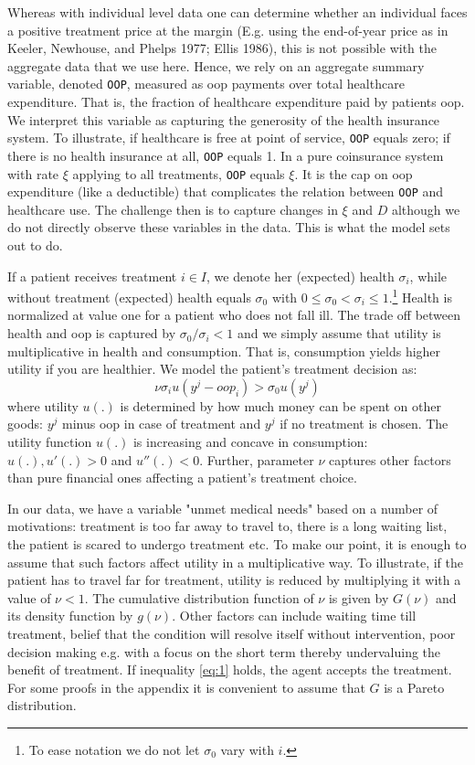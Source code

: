 \documentclass[a4paper,12pt]{article}
\makeatletter
\newcommand{\citeprocitem}[2]{\hyper@linkstart{cite}{citeproc_bib_item_#1}#2\hyper@linkend}
\makeatother
\begin{document}
Whereas with individual level data one can determine whether an individual faces a positive treatment price at the margin (E.g. using the end-of-year price as in \citeprocitem{14}{Keeler, Newhouse, and Phelps 1977}; \citeprocitem{10}{Ellis 1986}), this is not possible with the aggregate data that we use here. Hence, we rely on an aggregate summary variable, denoted \texttt{OOP}, measured as oop payments over total healthcare expenditure. That is, the fraction of healthcare expenditure paid by patients oop. We interpret this variable as capturing the generosity of the health insurance system. To illustrate, if healthcare is free at point of service, \texttt{OOP} equals zero; if there is no health insurance at all, \texttt{OOP} equals 1. In a pure coinsurance system with rate \(\xi\) applying to all treatments, \texttt{OOP} equals \(\xi\). It is the cap on oop expenditure (like a deductible) that complicates the relation between \texttt{OOP} and healthcare use. The challenge then is to capture changes in \(\xi\) and \(D\) although we do not directly observe these variables in the data. This is what the model sets out to do.

If a patient receives treatment \(i \in I\), we denote her (expected) health \(\sigma_i\), while without treatment (expected) health equals \(\sigma_0\) with \(0 \leq \sigma_0 < \sigma_i \leq 1\).\footnote{To ease notation we do not let \(\sigma_0\) vary with \(i\).} Health is normalized at value one for a patient who does not fall ill. The trade off between health and oop is captured by \(\sigma_0/\sigma_i <1\) and we simply assume that utility is multiplicative in health and consumption. That is, consumption yields higher utility if you are healthier. We model the patient's treatment decision as:
\begin{equation}
\label{eq:1}
\nu \sigma_i u(y^j-oop_i) > \sigma_0 u(y^j)
\end{equation}
where utility \(u(.)\) is determined by how much money can be spent on other goods: \(y^j\) minus oop in case of treatment and \(y^j\) if no treatment is chosen. The utility function \(u(.)\) is increasing and concave in consumption: \(u(.), u'(.) >0\) and \(u''(.) < 0\). Further, parameter \(\nu\) captures other factors than pure financial ones affecting a patient's treatment choice.

In our data, we have a variable "unmet medical needs" based on a number of motivations: treatment is too far away to travel to, there is a long waiting list, the patient is scared to undergo treatment etc. To make our point, it is enough to assume that such factors affect utility in a multiplicative way. To illustrate, if the patient has to travel far for treatment, utility is reduced by multiplying it with a value of \(\nu < 1\). The cumulative distribution function of \(\nu\) is given by \(G(\nu)\) and its density function by \(g(\nu)\). Other factors can include waiting time till treatment, belief that the condition will resolve itself without intervention, poor decision making e.g. with a focus on the short term thereby undervaluing the benefit of treatment. If inequality \eqref{eq:1} holds, the agent accepts the treatment. For some proofs in the appendix it is convenient to assume that \(G\) is a Pareto distribution.
\end{document}
